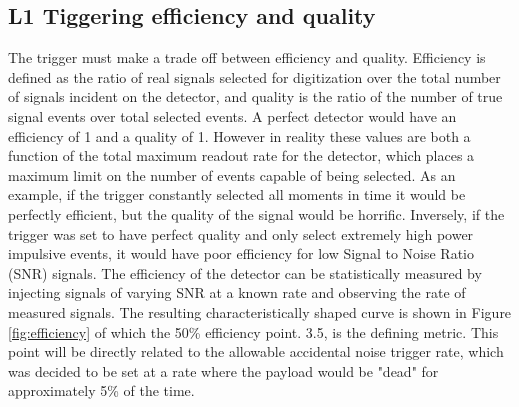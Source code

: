 	\subsection{L1 Tiggering efficiency and quality}
		The trigger must make a trade off between efficiency and quality.  Efficiency is defined as the ratio of real signals selected for digitization over the total number of signals incident on the detector, and quality is the ratio of the number of true signal events over total selected events.  A perfect detector would have an efficiency of 1 and a quality of 1.  However in reality these values are both a function of the total maximum readout rate for the detector, which places a maximum limit on the number of events capable of being selected.  As an example, if the trigger constantly selected all moments in time it would be perfectly efficient, but the quality of the signal would be horrific.  Inversely, if the trigger was set to have perfect quality and only select extremely high power impulsive events, it would have poor efficiency for low Signal to Noise Ratio (SNR) signals.  The efficiency of the detector can be statistically measured by injecting signals of varying SNR at a known rate and observing the rate of measured signals.  The resulting characteristically shaped curve is shown in Figure \ref{fig:efficiency} of which the 50\% efficiency point. 3.5, is the defining metric.  This point will be directly related to the allowable accidental noise trigger rate, which was decided to be set at a rate where the payload would be "dead" for approximately 5\% of the time.
		
